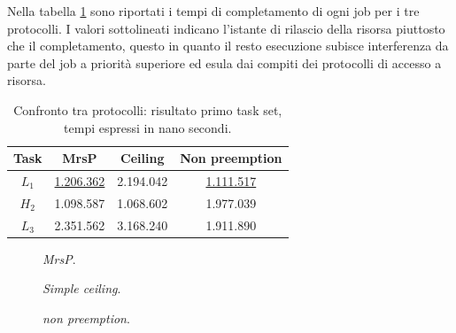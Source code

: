 \noindent Nella tabella \ref{tab:test_protocols_Taskset1_ris} sono riportati i tempi di completamento di ogni job per i tre protocolli. I valori sottolineati indicano l'istante di rilascio della risorsa piuttosto che il completamento, questo in quanto il resto esecuzione subisce interferenza da parte del job a priorità superiore ed esula dai compiti dei protocolli di accesso a risorsa.\\

\begin{table}
  \centering
  \begin{tabular}{cccc}
  \hline\hline
    Task & MrsP & Ceiling & Non preemption \\ \hline
    $L_1$ & \underline{1.206.362} & 2.194.042 & \underline{1.111.517} \\
    $H_2$ & 1.098.587 & 1.068.602 & 1.977.039 \\
    $L_3$ & 2.351.562 & 3.168.240 & 1.911.890 \\
    \hline
    \end{tabular}
  \caption{Confronto tra protocolli: risultato primo task set, tempi espressi in nano secondi.}
  \label{tab:test_protocols_Taskset1_ris}
\end{table}

    \begin{figure}
      \centering
      \RisultatoUnoMrsP
      \caption{\textit{MrsP}.}
      \label{fig:test_protocols_mrsp}
    \end{figure}

    \begin{figure}
      \centering
      \RisultatoUnoCeiling
      \caption{\textit{Simple ceiling}.}
      \label{fig:test_protocols_sc}
    \end{figure}
    
    \begin{figure}
      \centering
      \RisultatoUnoNoPreempion
      \caption{\textit{non preemption}.}
      \label{fig:test_protocols_np}
    \end{figure}

